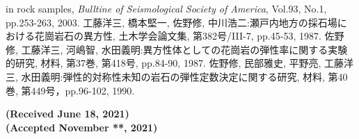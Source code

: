 \documentclass{jsce}
\begin{document}
\begin{thebibliography}{99}
\begin{spacing}{1.175}
	in rock samples, {\it Bulltine of Seismological Society of America}, Vol.93, No.1, pp.253-263, 2003.
	工藤洋三, 橋本堅一, 佐野修, 中川浩二:瀬戸内地方の採石場における花崗岩石の異方性, 
	土木学会論文集, 第382号/III-7, pp.45-53, 1987.
	佐野修, 工藤洋三, 河嶋智, 水田義明:異方性体としての花崗岩の弾性率に関する実験的研究, 
	材料, 第37巻, 第418号, pp.84-90, 1987.
	佐野修, 民部雅史, 平野亮, 工藤洋三, 水田義明:弾性的対称性未知の岩石の弾性定数決定に関する研究, 
	材料, 第40巻, 第449号，pp.96-102, 1990.
\end{spacing}
\end{thebibliography}
\begin{flushright}
	\small
	\bf{ (Received June 18, 2021)\\
	(Accepted November **, 2021)}
\end{flushright}
\end{document}

